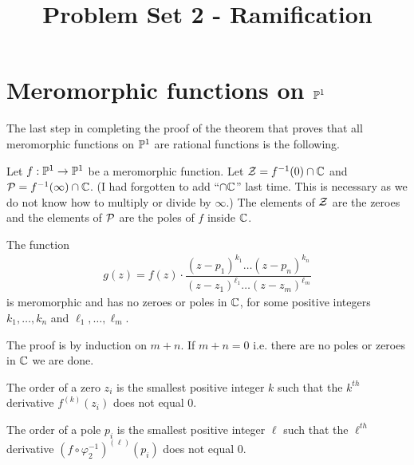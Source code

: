 \documentclass{article}
\begin{document}
  \title{Problem Set 2 - Ramification}
  \date{}
  \maketitle









\section{Meromorphic functions on $\mathbb{P}^1$}

The last step in completing the proof of the theorem that proves that all meromorphic functions on $\mathbb{P}^1$ are rational functions is the following.

Let $f: \mathbb{P}^1 \rightarrow \mathbb{P}^1$ be a meromorphic function.
Let $\mathcal{Z} = f^{-1}(0) \cap \mathbb{C}$ and $\mathcal{P} = f^{-1}(\infty) \cap \mathbb{C}$. (I had forgotten to add ``$\cap \mathbb{C}$'' last time. This is necessary as we do not know how to multiply or divide by $\infty$.)
The elements of $\mathcal{Z}$ are the zeroes and the elements of $\mathcal{P}$ are the poles of $f$ inside $\mathbb{C}$.

\begin{proposition}
  \label{thm:Theorem1}
  The function
  \begin{align*}
    g(z) = f(z) \cdot \dfrac{(z-p_1)^{k_1} \dots (z-p_n)^{k_n}}{(z-z_1)^{\ell_1} \dots (z-z_m)^{\ell_m}}
  \end{align*}
  is meromorphic and has no zeroes or poles in $\mathbb{C}$, for some positive integers $k_1, \dots, k_n$ and $\ell_1, \dots, \ell_m$.
\end{proposition}

The proof is by induction on $m + n$. If $m + n = 0$ i.e. there are no poles or zeroes in $\mathbb{C}$ we are done.

\begin{definition}
  The order of a zero $z_i$ is the smallest positive integer $k$ such that the $k^{th}$ derivative $f^{(k)}(z_i)$ does not equal $0$.
\end{definition}

\begin{definition}
  The order of a pole $p_i$ is the smallest positive integer $\ell$ such that the $\ell^{th}$ derivative $(f \circ \varphi_2^{-1})^{(\ell)}(p_i)$ does not equal $0$.
\end{definition}
\end{document}

